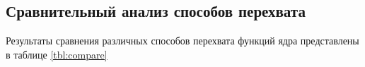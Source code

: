 






\subsection{Сравнительный анализ способов перехвата}

Результаты сравнения различных способов перехвата функций ядра представлены в таблице \ref{tbl:compare}

\clearpage

